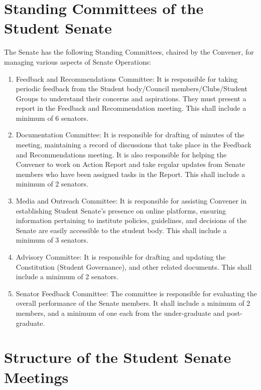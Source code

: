 \documentclass[12pt]{article}
\begin{document}
\section{Standing Committees of the Student Senate} \label{Standing committees}
The Senate has the following Standing Committees, chaired by the Convener, for managing various aspects of Senate Operations:
\begin{enumerate}
    \item Feedback and Recommendations Committee: It is responsible for taking periodic feedback from the Student body/Council members/Clubs/Student Groups to understand their concerns and aspirations. They must present a report in the Feedback and Recommendation meeting. This shall include a minimum of 6 senators.
    \item Documentation Committee: It is responsible for drafting of minutes of the meeting, maintaining a record of discussions that take place in the Feedback and Recommendations meeting. It is also responsible for helping the Convener to work on Action Report and take regular updates from Senate members who have been assigned tasks in the Report. This shall include a minimum of 2 senators.
    \item Media and Outreach Committee: It is responsible for assisting Convener in establishing Student Senate's presence on online platforms, ensuring information pertaining to institute policies, guidelines, and decisions of the Senate are easily accessible to the student body. This shall include a minimum of 3 senators.
    \item Advisory Committee: It is responsible for drafting and updating the Constitution (Student Governance), and other related documents. This shall include a minimum of 2 senators.
    \item Senator Feedback Committee: The committee is responsible for evaluating the overall performance of the Senate members. It shall include a minimum of 2 members, and a minimum of one each from the under-graduate and post-graduate.
\end{enumerate}


\section{Structure of the Student Senate Meetings}
\end{document}
